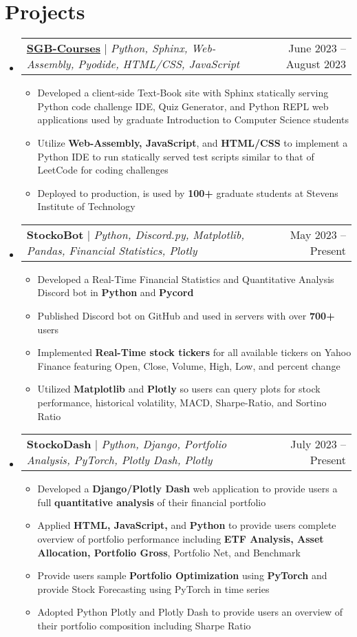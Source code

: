 \documentclass[letterpaper,10pt]{article}
\makeatletter
\newcommand{\resumeItem}[1]{
  \item\small{
    {#1 \vspace{-2pt}}
  }
}
\newcommand{\resumeProjectHeading}[2]{
    \item
    \begin{tabular*}{0.97\textwidth}{l@{\extracolsep{\fill}}r}
      \small#1 & #2 \\
    \end{tabular*}\vspace{-7pt}
}
\newcommand{\resumeSubHeadingListStart}{\begin{itemize}[leftmargin=0.15in, label={}]}
\newcommand{\resumeSubHeadingListEnd}{\end{itemize}}
\newcommand{\resumeItemListStart}{\begin{itemize}}
\newcommand{\resumeItemListEnd}{\end{itemize}\vspace{-5pt}}
\makeatother
\begin{document}
\section{Projects}
    \resumeSubHeadingListStart
      \resumeProjectHeading
          {\textbf{\href{https://cs515s2024.greenberg.science/}{SGB-Courses}} $|$ \emph{Python, Sphinx, Web-Assembly, Pyodide, HTML/CSS, JavaScript}}{June 2023 -- August 2023}
          \resumeItemListStart
            \resumeItem{Developed a client-side Text-Book site with Sphinx statically serving Python code challenge IDE, Quiz Generator, and Python REPL web applications used by graduate Introduction to Computer Science students}
            \resumeItem{Utilize \textbf{Web-Assembly, JavaScript}, and \textbf{HTML/CSS} to implement a Python IDE to run statically served test scripts similar to that of LeetCode for coding challenges}
            \resumeItem{Deployed to production, is used by \textbf{100+} graduate students at Stevens Institute of Technology}
          \resumeItemListEnd
      \resumeProjectHeading
          {\textbf{StockoBot} $|$ \emph{Python, Discord.py, Matplotlib, Pandas, Financial Statistics, Plotly}}{May 2023 -- Present}
          \resumeItemListStart
            \resumeItem{Developed a Real-Time Financial Statistics and Quantitative Analysis Discord bot in \textbf{Python} and \textbf{Pycord}}
            \resumeItem{Published Discord bot on GitHub and used in servers with over \textbf{700+} users}
            \resumeItem{Implemented \textbf{Real-Time stock tickers} for all available tickers on Yahoo Finance featuring Open, Close, Volume, High, Low, and percent change}
            \resumeItem{Utilized \textbf{Matplotlib} and \textbf{Plotly} so users can query plots for stock performance, historical volatility, MACD, Sharpe-Ratio, and Sortino Ratio}
          \resumeItemListEnd
      \resumeProjectHeading
          {\textbf{StockoDash} $|$ \emph{Python, Django, Portfolio Analysis, PyTorch, Plotly Dash, Plotly}}{July 2023 -- Present}
          \resumeItemListStart
            \resumeItem{Developed a \textbf{Django/Plotly Dash} web application to provide users a full \textbf{quantitative analysis} of their financial portfolio}\\
            \resumeItem{Applied \textbf{HTML, JavaScript,} and \textbf{Python} to provide users complete overview of portfolio performance including \textbf{ETF Analysis, Asset Allocation, Portfolio Gross}, Portfolio Net, and Benchmark}
            \resumeItem{Provide users sample \textbf{Portfolio Optimization} using \textbf{PyTorch} and provide Stock Forecasting using PyTorch in time series}
            \resumeItem{Adopted Python Plotly and Plotly Dash to provide users an overview of their portfolio composition including Sharpe Ratio}
          \resumeItemListEnd
    \resumeSubHeadingListEnd
\end{document}
